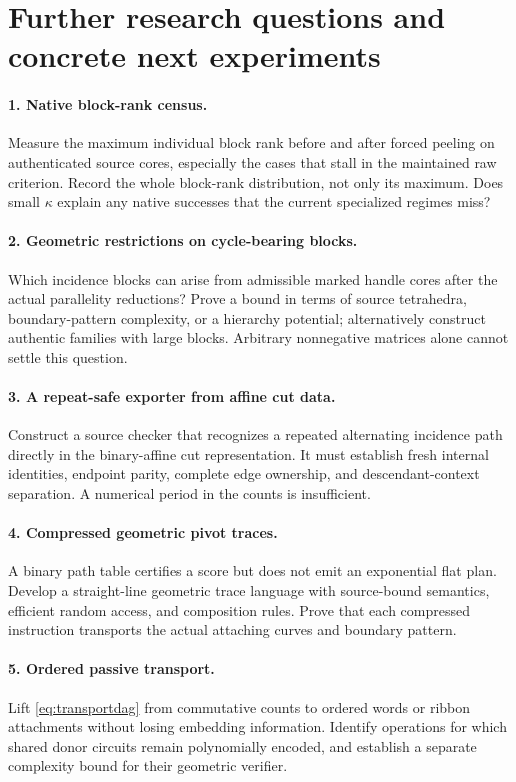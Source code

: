 \documentclass[11pt,letterpaper]{article}
\theoremstyle{definition}
\theoremstyle{remark}
\begin{document}
\section{Further research questions and concrete next experiments}
\label{sec:future}

\paragraph{1. Native block-rank census.}
Measure the maximum individual block rank before and after forced peeling on authenticated source cores, especially the cases that stall in the maintained raw criterion. Record the whole block-rank distribution, not only its maximum. Does small $\kappa$ explain any native successes that the current specialized regimes miss?

\paragraph{2. Geometric restrictions on cycle-bearing blocks.}
Which incidence blocks can arise from admissible marked handle cores after the actual parallelity reductions? Prove a bound in terms of source tetrahedra, boundary-pattern complexity, or a hierarchy potential; alternatively construct authentic families with large blocks. Arbitrary nonnegative matrices alone cannot settle this question.

\paragraph{3. A repeat-safe exporter from affine cut data.}
Construct a source checker that recognizes a repeated alternating incidence path directly in the binary-affine cut representation. It must establish fresh internal identities, endpoint parity, complete edge ownership, and descendant-context separation. A numerical period in the counts is insufficient.

\paragraph{4. Compressed geometric pivot traces.}
A binary path table certifies a score but does not emit an exponential flat plan. Develop a straight-line geometric trace language with source-bound semantics, efficient random access, and composition rules. Prove that each compressed instruction transports the actual attaching curves and boundary pattern.

\paragraph{5. Ordered passive transport.}
Lift \cref{eq:transportdag} from commutative counts to ordered words or ribbon attachments without losing embedding information. Identify operations for which shared donor circuits remain polynomially encoded, and establish a separate complexity bound for their geometric verifier.
\end{document}
